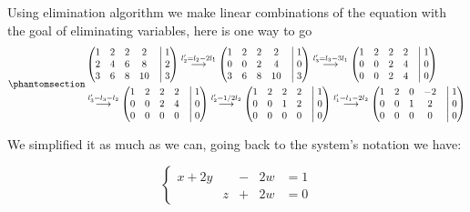 \documentclass[
  letterpaper,
  DIV=11,
  numbers=noendperiod]{scrartcl}
\theoremstyle{definition}
\theoremstyle{remark}
\begin{document}
Using elimination algorithm we make linear combinations of the equation
with the goal of eliminating variables, here is one way to go\\
\begin{equation}\phantomsection\label{eq-example_4_system}{
\begin{align}
&\begin{pmatrix}
1 & 2 & 2 & 2 &\bigm|1\\
2 & 4 & 6 & 8 &\bigm|2\\
3 & 6 & 8 & 10 &\bigm| 3
\end{pmatrix}
\overset{l_2' = l_2-2l_1}{\longrightarrow}
\begin{pmatrix}
1 & 2 & 2 & 2 &\bigm| 1\\
0 & 0 & 2 & 4 &\bigm| 0\\
3 & 6 & 8 & 10 &\bigm| 3
\end{pmatrix}
\overset{l_3' = l_3-3l_1}{\longrightarrow}
\begin{pmatrix}
1 & 2 & 2 & 2 &\bigm| 1\\
0 & 0 & 2 & 4 &\bigm| 0\\
0 & 0 & 2 & 4 &\bigm| 0
\end{pmatrix}\\
&\overset{l_3'=l_3-l_2}{\longrightarrow}
\begin{pmatrix}
1 & 2 & 2 & 2 &\bigm| 1\\
0 & 0 & 2 & 4 &\bigm| 0\\
0 & 0 & 0 & 0 &\bigm| 0
\end{pmatrix}
\overset{l_2'=1/2l_2}{\longrightarrow}
\begin{pmatrix}
1 & 2 & 2 & 2 &\bigm| 1\\
0 & 0 & 1 & 2 &\bigm| 0\\
0 & 0 & 0 & 0 &\bigm| 0
\end{pmatrix}
\overset{l_1'=l_1-2l_2}{\longrightarrow}
\begin{pmatrix}
1 & 2 & 0 & -2 &\bigm| 1\\
0 & 0 & 1 & 2 &\bigm| 0\\
0 & 0 & 0 & 0 &\bigm| 0
\end{pmatrix}
\end{align}
}\end{equation}

We simplified it as much as we can, going back to the system's notation
we have:

\[
\begin{cases}
x + 2 y & &- &2w &=1\\
&z &+ &2w &=0
\end{cases}
\]
\end{document}
